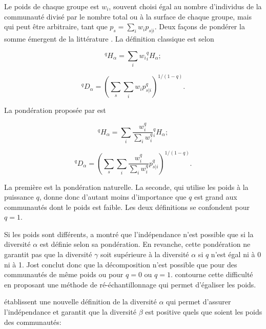 \documentclass[
  11pt,
  french,
  a4paper,
  extrafontsizes,onecolumn,openright
  ]{memoir}
\newlength{\rf}
\begin{document}
Le poids de chaque groupe est \(w_i\), souvent choisi égal au nombre d'individus de la communauté divisé par le nombre total ou à la surface de chaque groupe, mais qui peut être arbitraire, tant que \(p_s=\sum_i{w_i p_{s|i}}\).
Deux façons de pondérer la somme émergent de la littérature \autocite{Chao2012a}.
La définition classique est selon \textcite{Routledge1979}

\begin{equation}
  \label{eq:RoutledgeHalpha}
  ^{q}\!H_{\alpha} = \sum_i{w_i {^{q}_{i}\!H_{\alpha}}};
\end{equation}

\begin{equation}
  \label{eq:RoutledgeDalpha}
  ^{q}\!D_{\alpha}={\left(\sum_s{\sum_i{w_i p^q_{s|i}}}\right)}^{1/{\left(1-q\right)}}.
\end{equation}

La pondération proposée par \textcite{Jost2007} est

\begin{equation}
  \label{eq:JostHalpha}
  ^{q}\!H_{\alpha} = \sum_i{\frac{w^q_i}{\sum_i{w^q_i}} {^{q}_{i}\!H_{\alpha}}};
\end{equation}

\begin{equation}
  \label{eq:JostDalpha}
  ^{q}\!D_{\alpha} = {\left(\sum_s{\sum_i{\frac{w^q_i}{\sum_i{w^q_i}}p^q_{s|i}}}\right)}^{{1}/{\left(1-q\right)}}.
\end{equation}

La première est la pondération naturelle.
La seconde, qui utilise les poids à la puissance \(q\), donne donc d'autant moins d'importance que \(q\) est grand aux communautés dont le poids est faible.
Les deux définitions se confondent pour \(q=1\).

Si les poids sont différents, \textcite{Jost2007} a montré que l'indépendance n'est possible que si la diversité \(\alpha\) est définie selon sa pondération.
En revanche, cette pondération ne garantit pas que la diversité \(\gamma\) soit supérieure à la diversité \(\alpha\) si \(q\) n'est égal ni à 0 ni à 1.
Jost conclut donc que la décomposition n'est possible que pour des communautés de même poids ou pour \(q=0\) ou \(q=1\).
\textcite{Ricotta2009b} contourne cette difficulté en proposant une méthode de ré-échantillonnage qui permet d'égaliser les poids.

\textcite{Chiu2014} établissent une nouvelle définition de la diversité \(\alpha\) qui permet d'assurer l'indépendance et garantit que la diversité \(\beta\) est positive quels que soient les poids des communautés:
\end{document}
